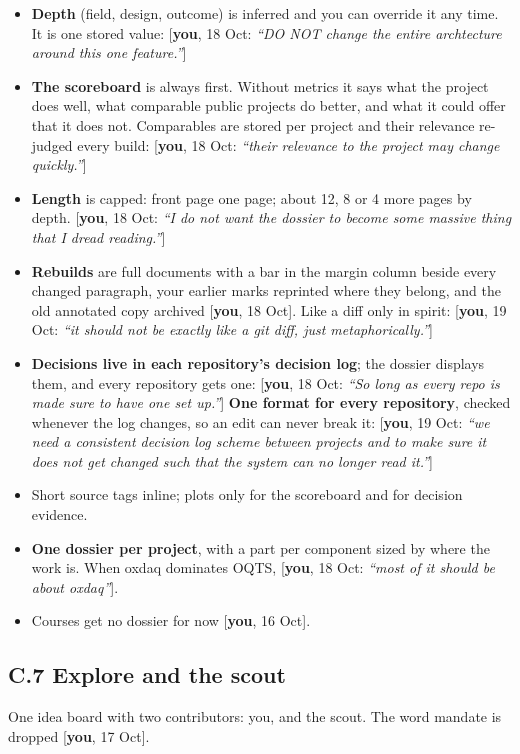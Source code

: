 \documentclass[10pt]{extarticle}
\newcommand{\you}[2]{{\small[\textbf{you}, #1: \textit{``#2''}]}}
\newcommand{\youx}[1]{{\small[\textbf{you}, #1]}}
\newcommand{\Sub}[1]{\subsection*{#1}}
\begin{document}
\begin{itemize}
\item \textbf{Depth} (field, design, outcome) is inferred and you can override it any time. It is one stored value: \you{18 Oct}{DO NOT change the entire archtecture around this one feature.}
\item \textbf{The scoreboard} is always first. Without metrics it says what the project does well, what comparable public projects do better, and what it could offer that it does not. Comparables are stored per project and their relevance re-judged every build: \you{18 Oct}{their relevance to the project may change quickly.}
\item \textbf{Length} is capped: front page one page; about 12, 8 or 4 more pages by depth. \you{18 Oct}{I do not want the dossier to become some massive thing that I dread reading.}
\item \textbf{Rebuilds} are full documents with a bar in the margin column beside every changed paragraph, your earlier marks reprinted where they belong, and the old annotated copy archived \youx{18 Oct}. Like a diff only in spirit: \you{19 Oct}{it should not be exactly like a git diff, just metaphorically.}
\item \textbf{Decisions live in each repository's decision log}; the dossier displays them, and every repository gets one: \you{18 Oct}{So long as every repo is made sure to have one set up.} \textbf{One format for every repository}, checked whenever the log changes, so an edit can never break it: \you{19 Oct}{we need a consistent decision log scheme between projects and to make sure it does not get changed such that the system can no longer read it.}
\item Short source tags inline; plots only for the scoreboard and for decision evidence.
\item \textbf{One dossier per project}, with a part per component sized by where the work is. When oxdaq dominates OQTS, \you{18 Oct}{most of it should be about oxdaq}.
\item Courses get no dossier for now \youx{16 Oct}.
\end{itemize}

\Sub{C.7 Explore and the scout}
One idea board with two contributors: you, and the scout. The word mandate is dropped \youx{17 Oct}.
\end{document}
